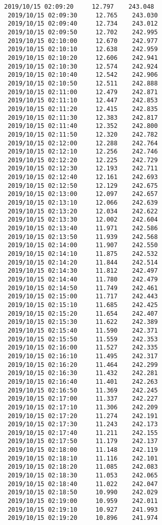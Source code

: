 \documentclass[11pt]{article}
\begin{document}
\begin{Verbatim}[commandchars=\\\{\}]
 2019/10/15 02:09:20     12.797    243.048
 2019/10/15 02:09:30     12.765    243.030
 2019/10/15 02:09:40     12.734    243.012
 2019/10/15 02:09:50     12.702    242.995
 2019/10/15 02:10:00     12.670    242.977
 2019/10/15 02:10:10     12.638    242.959
 2019/10/15 02:10:20     12.606    242.941
 2019/10/15 02:10:30     12.574    242.924
 2019/10/15 02:10:40     12.542    242.906
 2019/10/15 02:10:50     12.511    242.888
 2019/10/15 02:11:00     12.479    242.871
 2019/10/15 02:11:10     12.447    242.853
 2019/10/15 02:11:20     12.415    242.835
 2019/10/15 02:11:30     12.383    242.817
 2019/10/15 02:11:40     12.352    242.800
 2019/10/15 02:11:50     12.320    242.782
 2019/10/15 02:12:00     12.288    242.764
 2019/10/15 02:12:10     12.256    242.746
 2019/10/15 02:12:20     12.225    242.729
 2019/10/15 02:12:30     12.193    242.711
 2019/10/15 02:12:40     12.161    242.693
 2019/10/15 02:12:50     12.129    242.675
 2019/10/15 02:13:00     12.097    242.657
 2019/10/15 02:13:10     12.066    242.639
 2019/10/15 02:13:20     12.034    242.622
 2019/10/15 02:13:30     12.002    242.604
 2019/10/15 02:13:40     11.971    242.586
 2019/10/15 02:13:50     11.939    242.568
 2019/10/15 02:14:00     11.907    242.550
 2019/10/15 02:14:10     11.875    242.532
 2019/10/15 02:14:20     11.844    242.514
 2019/10/15 02:14:30     11.812    242.497
 2019/10/15 02:14:40     11.780    242.479
 2019/10/15 02:14:50     11.749    242.461
 2019/10/15 02:15:00     11.717    242.443
 2019/10/15 02:15:10     11.685    242.425
 2019/10/15 02:15:20     11.654    242.407
 2019/10/15 02:15:30     11.622    242.389
 2019/10/15 02:15:40     11.590    242.371
 2019/10/15 02:15:50     11.559    242.353
 2019/10/15 02:16:00     11.527    242.335
 2019/10/15 02:16:10     11.495    242.317
 2019/10/15 02:16:20     11.464    242.299
 2019/10/15 02:16:30     11.432    242.281
 2019/10/15 02:16:40     11.401    242.263
 2019/10/15 02:16:50     11.369    242.245
 2019/10/15 02:17:00     11.337    242.227
 2019/10/15 02:17:10     11.306    242.209
 2019/10/15 02:17:20     11.274    242.191
 2019/10/15 02:17:30     11.243    242.173
 2019/10/15 02:17:40     11.211    242.155
 2019/10/15 02:17:50     11.179    242.137
 2019/10/15 02:18:00     11.148    242.119
 2019/10/15 02:18:10     11.116    242.101
 2019/10/15 02:18:20     11.085    242.083
 2019/10/15 02:18:30     11.053    242.065
 2019/10/15 02:18:40     11.022    242.047
 2019/10/15 02:18:50     10.990    242.029
 2019/10/15 02:19:00     10.959    242.011
 2019/10/15 02:19:10     10.927    241.993
 2019/10/15 02:19:20     10.896    241.974

\end{Verbatim}
\end{document}
